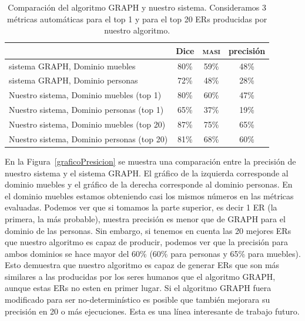 \begin{table}[h]
\begin{center}
\begin{tabular}{|l|c|c|c|}
\hline
	 	& 	Dice		&	\textsc{masi}	&	precisi\'on		\\
\hline
sistema GRAPH, Dominio muebles	& 	80\% 		&	59\%	&	48\%		 	\\
sistema GRAPH, Dominio personas 	& 	72\%		&	48\%	&	28\%			\\
\hline
Nuestro sistema, Dominio muebles (top 1)	&	80\%		&	60\%	&	47\%		\\
Nuestro sistema, Dominio personas (top 1)	&	65\%		&	37\%	&	19\%		\\
\hline
Nuestro sistema, Dominio muebles (top 20)&	87\%		&	75\%  	&	65\%		\\
Nuestro sistema, Dominio personas (top 20)   &	81\%		&68\%	&	60\%		\\
\hline
\end{tabular}
\caption{Comparaci\'on del algoritmo GRAPH y nuestro sistema. Consideramos 3 m\'etricas autom\'aticas para el top 1 y para el top 20 ERs producidas por nuestro algoritmo.}
\label{Tabla_sis_1_20}
\end{center}
\end{table}

En la Figura~\ref{graficoPresicion} se muestra una comparaci\'on entre la precisi\'on de nuestro sistema y el sistema GRAPH. El gr\'afico de la izquierda corresponde al dominio muebles y el gr\'afico de la derecha corresponde al dominio personas. En el dominio muebles estamos obteniendo casi los mismos n\'umeros en las m\'etricas evaluadas.
Podemos ver que si tomamos la parte superior, es decir 1 ER (la primera, la m\'as probable), nuestra precisi\'on es menor que de GRAPH para el dominio de las personas. Sin embargo, si tenemos en cuenta las 20 mejores ERs que nuestro algoritmo es capaz de producir, podemos ver que la precisi\'on para ambos dominios se hace mayor del 60\% (60\% para personas y 65\% para muebles). Esto demuestra que nuestro algoritmo es capaz de generar ERs que son m\'as similares a las producidas por los seres humanos que el algoritmo GRAPH, aunque estas ERs no esten en primer lugar. Si el algoritmo GRAPH fuera modificado para ser no-determin\'istico es posible que tambi\'en mejorara su precisi\'on en 20 o m\'as ejecuciones. Esta es una l\'inea interesante de trabajo futuro. 

